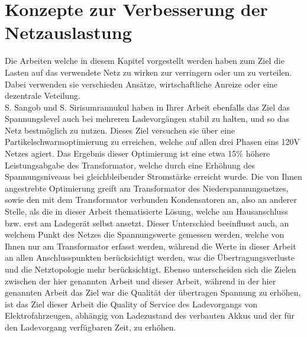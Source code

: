 \section{Konzepte zur Verbesserung der Netzauslastung}
Die Arbeiten welche in diesem Kapitel vorgestellt werden haben zum Ziel die Lasten auf das verwendete Netz zu wirken zur verringern oder um zu verteilen. Dabei verwenden sie verschieden Ansätze, wirtschaftliche Anreize oder eine dezentrale Veteilung.\\
S. Sangob und S. Sirisumrannukul \cite{RW_1_1} haben in Ihrer Arbeit ebenfalls das Ziel das Spannungslevel auch bei mehreren Ladevorgängen stabil zu halten, und so das Netz bestmöglich zu nutzen. Dieses Ziel versuchen sie über eine Partikelschwarmoptimierung zu erreichen, welche auf allen drei Phasen eins 120V Netzes agiert. Das Ergebnis dieser Optimierung ist eine etwa 15\% höhere Leistungsabgabe des Transformator, welche durch eine Erhöhung des Spannungsniveaus bei gleichbleibender Stromstärke erreicht wurde. Die von Ihnen angestrebte Optimierung greift  am Transformator des Niederspannungsnetzes, sowie den mit dem Transformator verbunden Kondensatoren an, also an anderer Stelle, als die in dieser Arbeit thematisierte Lösung, welche am Hausanschluss bzw. erst am Ladegerät selbst ansetzt. Dieser Unterschied beeinflusst auch, an welchem Punkt des Netzes die Spannungswerte gemessen werden, welche von Ihnen nur am Transformator erfasst werden, während die Werte in dieser Arbeit an allen Anschlusspunkten berücksichtigt werden, was die Übertragungsverluste und die Netztopologie mehr berücksichtigt. Ebenso unterscheiden sich die Zielen zwischen der hier genannten Arbeit und dieser Arbeit, während in der hier genannten Arbeit das Ziel war die Qualität der übertragen Spannung zu erhöhen, ist das Ziel dieser Arbeit die Quality of Service des Ladevorgangs von Elektrofahrzeugen, abhängig von Ladezustand des verbauten Akkus und der für den Ladevorgang verfügbaren Zeit, zu erhöhen.
\\
